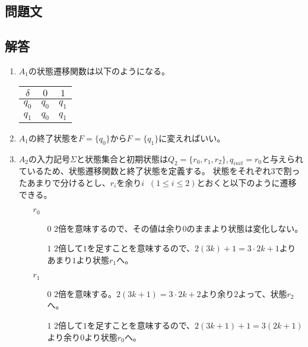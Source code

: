 \documentclass[dvipdfmx,titlepage, 11pt, a4paper]{jsarticle}%
\begin{document}
\section{}
\subsection{問題文}
\newpage
\subsection{解答}
\begin{enumerate}[(1)]
  \item $A_1$の状態遷移関数は以下のようになる。
  \begin{table}[htbp]
    \centering
    \begin{tabular}{c|cc}
      \hline
      $\delta$ & $0$ & $1$\\
      \hline
      $q_0$ & $q_0$ & $q_1$\\
      $q_1$ & $q_0$ & $q_1$\\
      \hline
    \end{tabular}
  \end{table}
  \item $A_1$の終了状態を$F=\{q_0\}$から$F=\{q_1\}$に変えればいい。
  \item $A_2$の入力記号$\Sigma$と状態集合と初期状態は$Q_2 = \{r_0, r_1, r_2\}, q_{init} = r_0$と与えられているため、状態遷移関数と終了状態を定義する。
  状態をそれぞれ$3$で割ったあまりで分けるとし、$r_i$を余り$i\;\;(1\leq i \leq 2)$とおくと以下のように遷移できる。
  \begin{itemize}
    \item [$r_0$] 
    \begin{itemize}
      \item[$0$] 
      $2$倍を意味するので、その値は余り$0$のままより状態は変化しない。
      \item[$1$] 
      $2$倍して$1$を足すことを意味するので、$2(3k) + 1 = 3\cdot 2k + 1$よりあまり$1$より状態$r_1$へ。
    \end{itemize}
    \item [$r_1$] 
    \begin{itemize}
      \item[$0$] 
      $2$倍を意味する。$2(3k + 1) = 3\cdot 2k + 2$より余り$2$よって、状態$r_2$へ。
      \item[$1$] 
      $2$倍して$1$を足すことを意味するので、$2(3k + 1) + 1 = 3(2k + 1)$より余り$0$より状態$r_0$へ。
    \end{itemize}

\end{itemize}
\end{enumerate}
\end{document}
